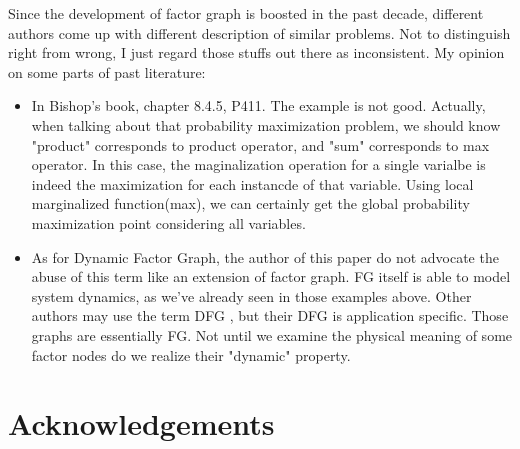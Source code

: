 \documentclass[11pt,a4paper]{article}
\begin{document}
Since the development of factor graph is boosted in the past decade, 
different authors come up with different description of similar problems. 
Not to distinguish right from wrong, I just regard those stuffs out there
as inconsistent. My opinion on some parts of past literature:
\begin{itemize}
	\item In Bishop's book\cite{bishop2006pattern}, chapter 8.4.5, P411. 
	The example is not good. Actually, when talking about that probability 
	maximization problem, we should know "product" corresponds to product operator, 
	and "sum" corresponds to max operator. In this case, the maginalization 
	operation for a single varialbe is indeed the maximization for each 
	instancde of that variable. Using local marginalized function(max), we 
	can certainly get the global probability maximization point considering
	all variables. 
	\item As for Dynamic Factor Graph, the author of this paper do not advocate 
	the abuse of this term like an extension of factor graph. FG itself is able 
	to model system dynamics, as we've already seen in those examples above. 
	Other authors may use the term DFG
\cite{wang2011-dynamic}
\cite{mirowski2009dynamic}
	, but their DFG is application specific. 
	Those graphs are essentially FG. Not until we examine the physical meaning of 
	some factor nodes do we realize their "dynamic" property. 
\end{itemize}

\section*{Acknowledgements}


\end{document}
